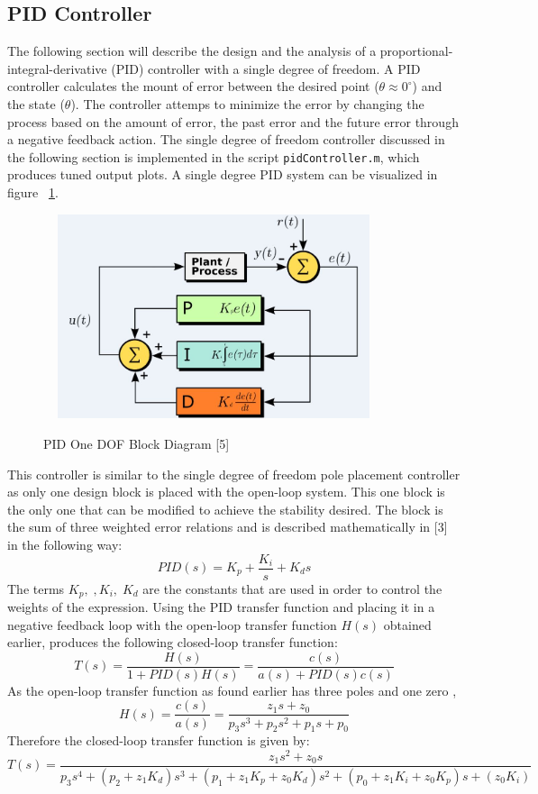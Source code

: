 \documentclass[12pt]{article} %
\begin{document}
\subsection{PID Controller}
The following section will describe the design and the analysis of a proportional-integral-derivative (PID) controller with a single degree of freedom. A PID controller calculates the mount of error between the desired point ($\theta \approx 0^{\circ}$) and the state ($\theta$). The controller attemps to minimize the error by changing the process based on the amount of error, the past error and the future error through a negative feedback action. The single degree of freedom controller discussed in the following section is implemented in the script \texttt{pidController.m}, which produces tuned output plots. A single degree PID system can be visualized in figure ~\ref{fig:PID_oneDOF}. 
\begin{figure}[h] 
\caption{PID One DOF Block Diagram [5]}
\includegraphics[height=6cm, width = 10cm]{PID_oneDOF.jpg}
\label{fig:PID_oneDOF}
\centering
\end{figure}
This controller is similar to the single degree of freedom pole placement controller as only one design block is placed with the open-loop system. This one block is the only one that can be modified to achieve the stability desired. The block is the sum of three weighted error relations and is described mathematically in [3] in the following way: 
\begin{equation}
PID(s) = K_p + \frac{K_i}{s} + K_d s
\end{equation}
The terms $K_p, \;, K_i, \;K_d$ are the constants that are used in order to control the weights of the expression. Using the PID transfer function and placing it in a negative feedback loop with the open-loop transfer function $H(s)$ obtained earlier, produces the following closed-loop transfer function:
\begin{equation}
T(s) = \frac{H(s)}{1 + PID(s) H(s)} = \frac{c(s)}{a(s) + PID(s)c(s)}
\end{equation}
As the open-loop transfer function as found earlier has three poles and one zero , 
\begin{equation}
 H(s) = \frac{c(s)}{a(s)} = \frac{z_1s + z_0}{p_3s^3 + p_2s^2 + p_1s + p_0}
\end{equation}
Therefore the closed-loop transfer function is given by:
\begin{equation}
T(s) = \frac{z_1s^2 + z_0s}{p_3s^4 + (p_2+z_1K_d)s^3 + (p_1+z_1K_p+z_0K_d)s^2 + (p_0+z_1K_i+z_0K_p)s + (z_0K_i)}
\end{equation}
\end{document}
